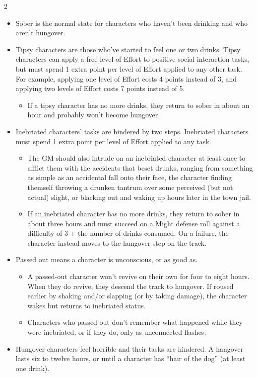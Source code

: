 \begin{multicols}{2}
\begin{itemize}
\item Sober is the normal state for characters who haven’t been drinking and who aren’t hungover. 
\item Tipsy characters are those who’ve started to feel one or two drinks. Tipsy characters can apply a free level of Effort to positive social interaction tasks, but must spend 1 extra point per level of Effort applied to any other task. For example, applying one level of Effort costs 4 points instead of 3, and applying two levels of Effort costs 7 points instead of 5. 
\begin{itemize}
  \item If a tipsy character has no more drinks, they return to sober in about an hour and probably won’t become hungover. 
\end{itemize}
\item Inebriated characters’ tasks are hindered by two steps. Inebriated characters must spend 1 extra point per level of Effort applied to any task. 
\begin{itemize}
\item The GM should also intrude on an inebriated character at least once to afflict them with the accidents that beset drunks, ranging from something as simple as an accidental fall onto their face, the character finding themself throwing a drunken tantrum over some perceived (but not actual) slight, or blacking out and waking up hours later in the town jail. 
\item If an inebriated character has no more drinks, they return to sober in about three hours and must succeed on a Might defense roll against a difficulty of 3 + the number of drinks consumed. On a failure, the character instead moves to the hungover step on the track.
\end{itemize}
\item Passed out means a character is unconscious, or as good as.
\begin{itemize}
\item A passed-out character won’t revive on their own for four to eight hours. When they do revive, they descend the track to hungover. If roused earlier by shaking and/or slapping (or by taking damage), the character wakes but returns to inebriated status. 
\item Characters who passed out don’t remember what happened while they were inebriated, or if they do, only as unconnected flashes.
\end{itemize}
\item Hungover characters feel horrible and their tasks are hindered. A hangover lasts six to twelve hours, or until a character has “hair of the dog” (at least one drink).
  \end{itemize}


\end{multicols}
